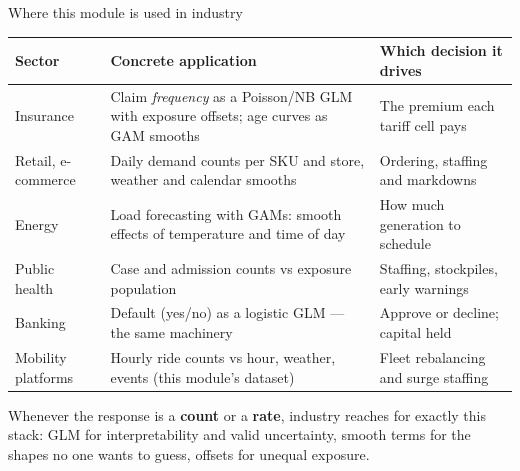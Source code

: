 \documentclass[aspectratio=169,11pt]{beamer}
\begin{document}
\begin{frame}{Where this module is used in industry}
  \scriptsize
  \begin{center}
  \begin{tabular}{@{}p{2.6cm}p{5.2cm}p{4.6cm}@{}}
    \toprule
    \textbf{Sector} & \textbf{Concrete application} & \textbf{Which decision it drives} \\
    \midrule
    Insurance & Claim \emph{frequency} as a Poisson/NB GLM with exposure offsets; age curves as GAM smooths & The premium each tariff cell pays \\
    Retail, e-commerce & Daily demand counts per SKU and store, weather and calendar smooths & Ordering, staffing and markdowns \\
    Energy & Load forecasting with GAMs: smooth effects of temperature and time of day & How much generation to schedule \\
    Public health & Case and admission counts vs exposure population & Staffing, stockpiles, early warnings \\
    Banking & Default (yes/no) as a logistic GLM --- the same machinery & Approve or decline; capital held \\
    Mobility platforms & Hourly ride counts vs hour, weather, events (this module's dataset) & Fleet rebalancing and surge staffing \\
    \bottomrule
  \end{tabular}
  \end{center}
  \begin{industry}
    Whenever the response is a \textbf{count} or a \textbf{rate}, industry reaches for exactly
    this stack: GLM for interpretability and valid uncertainty, smooth terms for the
    shapes no one wants to guess, offsets for unequal exposure.
  \end{industry}
\end{frame}
\end{document}
